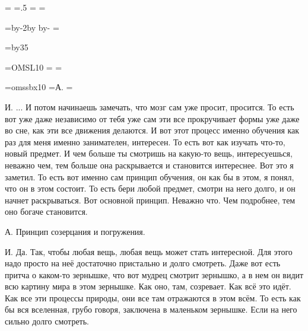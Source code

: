 \pdfpagewidth=297mm
\pdfpageheight=210mm
\pdfhorigin=1in
\pdfvorigin=0pt

\shhtotal=\pdfpagewidth
\htotal=.5\shhtotal
\vtotal=\pdfpageheight
\shoutline=0pt
\shstaplewidth=0pt
\shcrop=0pt
\shfootline={}
\shthickness=0pt %

\horigin=9mm
\hoffset=-9mm
\hsize=\htotal \advance\hsize by-2\horigin \advance\hsize by\hoffset
\advance\horigin by-\hoffset
\output={\ifodd\pageno\hoffset=0pt\fi \plainoutput}

\vorigin=15mm
\vsize=\topskip \advance\vsize by35\baselineskip

\font\TENSL=OMSL10
\headline={\line{\hrulefill}}
\footline={\line{\hss\tenrm\folio\hss}}

\font\speakerF=omssbx10
\def\A{\item{\speakerF А.}}
\def\I{\item{\speakerF И.}}
=\hbox{\speakerF А.\enskip}
\parindent=


\I
... И потом начинаешь замечать, что мозг сам уже просит, просится.
То есть вот уже даже независимо от тебя уже сам эти все прокручивает формы уже даже во сне,
как эти все движения делаются.
И вот этот процесс именно обучения как раз для меня именно занимателен, интересен.
То есть вот как изучать что-то, новый предмет.
И чем больше ты смотришь на какую-то вещь, интересуешься, неважно чем,
тем больше она раскрывается и становится интереснее.
Вот это я заметил.
То есть вот именно сам принцип обучения, он как бы в этом, я понял, что он в этом состоит.
То есть бери любой предмет, смотри на него долго, и он начнет раскрываться.
Вот основной принцип.
Неважно что.
Чем подробнее, тем оно богаче становится.

\A
Принцип созерцания и погружения.

\I
Да.
Так, чтобы любая вещь, любая вещь может стать интересной.
Для этого надо просто на неё достаточно пристально и долго смотреть.
Даже вот есть притча о каком-то зернышке, что вот мудрец смотрит зернышко,
а в нем он видит всю картину мира в этом зернышке.
Как оно, там, созревает.
Как всё это идёт.
Как все эти процессы природы, они все там отражаются в этом всём.
То есть как бы вся вселенная, грубо говоря, заключена в маленьком зернышке.
Если на него сильно долго смотреть.

